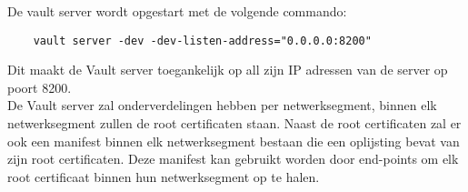 
De vault server wordt opgestart met de volgende commando:
\begin{verbatim}
    vault server -dev -dev-listen-address="0.0.0.0:8200"
\end{verbatim}

Dit maakt de Vault server toegankelijk op all zijn IP adressen van de server op poort 8200. \\
De Vault server zal onderverdelingen hebben per netwerksegment, binnen elk netwerksegment zullen de root certificaten staan. Naast de root certificaten zal er ook een manifest binnen elk netwerksegment bestaan die een oplijsting bevat van zijn root certificaten. 
Deze manifest kan gebruikt worden door end-points om elk root certificaat binnen hun netwerksegment op te halen. \\


